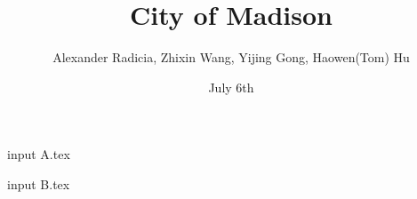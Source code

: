 \documentclass[12pt,twocolumn]{article}
\begin{document}
\title{City of Madison}
\author{Alexander Radicia, Zhixin Wang, Yijing Gong, Haowen(Tom) Hu}
\date{July 6th}
\maketitle

input {A.tex}

input {B.tex}
\end{document}
